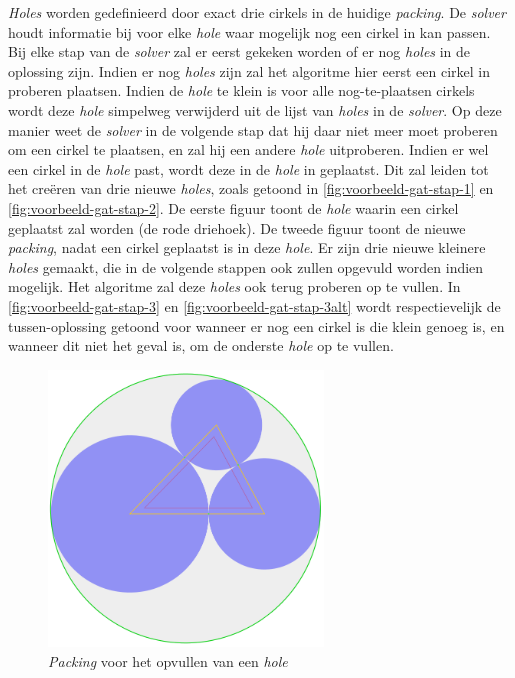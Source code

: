 \documentclass[12pt,a4paper,oneside]{book}
\begin{document}
\textit{Holes} worden gedefinieerd door exact drie cirkels in de huidige \textit{packing}.
De \textit{solver} houdt informatie bij voor elke \textit{hole} waar mogelijk nog een cirkel in kan passen.
Bij elke stap van de \textit{solver} zal er eerst gekeken worden of er nog \textit{holes} in de oplossing zijn.
Indien er nog \textit{holes} zijn zal het algoritme hier eerst een cirkel in proberen plaatsen.
Indien de \textit{hole} te klein is voor alle nog-te-plaatsen cirkels wordt deze \textit{hole} simpelweg verwijderd uit de lijst van \textit{holes} in de \textit{solver}.
Op deze manier weet de \textit{solver} in de volgende stap dat hij daar niet meer moet proberen om een cirkel te plaatsen, en zal hij een andere \textit{hole} uitproberen.
Indien er wel een cirkel in de \textit{hole} past, wordt deze in de \textit{hole} in geplaatst.
Dit zal leiden tot het creëren van drie nieuwe \textit{holes}, zoals getoond in \autoref{fig:voorbeeld-gat-stap-1} en \autoref{fig:voorbeeld-gat-stap-2}.
De eerste figuur toont de \textit{hole} waarin een cirkel geplaatst zal worden (de rode driehoek).
De tweede figuur toont de nieuwe \textit{packing}, nadat een cirkel geplaatst is in deze \textit{hole}.
Er zijn drie nieuwe kleinere \textit{holes} gemaakt, die in de volgende stappen ook zullen opgevuld worden indien mogelijk.
Het algoritme zal deze \textit{holes} ook terug proberen op te vullen.
In \autoref{fig:voorbeeld-gat-stap-3} en \autoref{fig:voorbeeld-gat-stap-3alt} wordt respectievelijk de tussen-oplossing getoond voor wanneer er nog een cirkel is die klein genoeg is, en wanneer dit niet het geval is, om de onderste \textit{hole} op te vullen.

\begin{figure}
  \centering
  \includegraphics[width=0.65\textwidth]{voorbeeld-gat-stap-1.png}
  \caption{\textit{Packing} voor het opvullen van een \textit{hole}} \label{fig:voorbeeld-gat-stap-1} 
\end{figure}
\end{document}
